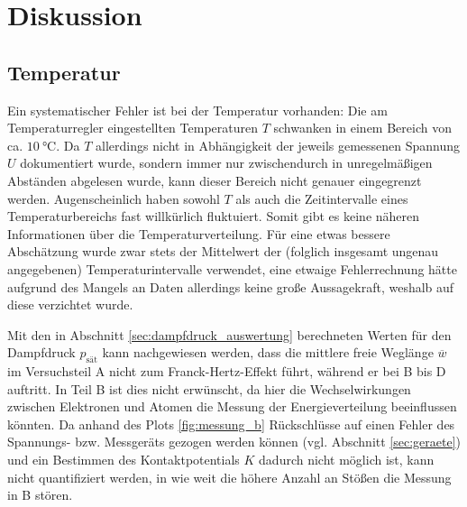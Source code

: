 \section{Diskussion}
\subsection{Temperatur}
Ein systematischer Fehler ist bei der Temperatur vorhanden:
Die am Temperaturregler eingestellten Temperaturen $T$ schwanken in einem Bereich von ca. $\qty[]{10}{\celsius}$.
Da $T$ allerdings nicht in Abhängigkeit der jeweils gemessenen Spannung $U$ dokumentiert wurde, 
sondern immer nur zwischendurch in unregelmäßigen Abständen abgelesen wurde, kann dieser Bereich nicht genauer eingegrenzt werden.
Augenscheinlich haben sowohl $T$ als auch die Zeitintervalle eines Temperaturbereichs fast willkürlich fluktuiert.
Somit gibt es keine näheren Informationen über die Temperaturverteilung.
Für eine etwas bessere Abschätzung wurde zwar stets der Mittelwert der (folglich insgesamt ungenau angegebenen) Temperaturintervalle verwendet,
eine etwaige Fehlerrechnung hätte aufgrund des Mangels an Daten allerdings keine große Aussagekraft, weshalb auf diese verzichtet wurde.

\noindent
Mit den in Abschnitt \ref{sec:dampfdruck_auswertung} berechneten Werten für den Dampfdruck $p_\text{sät}$ 
kann nachgewiesen werden, dass die mittlere freie Weglänge $\overline{w}$ im Versuchsteil A nicht zum Franck-Hertz-Effekt führt, 
während er bei B bis D auftritt.
In Teil B ist dies nicht erwünscht, da hier die Wechselwirkungen zwischen Elektronen und Atomen die Messung der Energieverteilung beeinflussen könnten.
Da anhand des Plots \ref{fig:messung_b} Rückschlüsse auf einen Fehler des Spannungs- bzw. Messgeräts gezogen werden können (vgl. Abschnitt \ref{sec:geraete})
und ein Bestimmen des Kontaktpotentials $K$ dadurch nicht möglich ist, kann nicht quantifiziert werden, in wie weit die höhere Anzahl an Stößen die Messung in B stören. 



